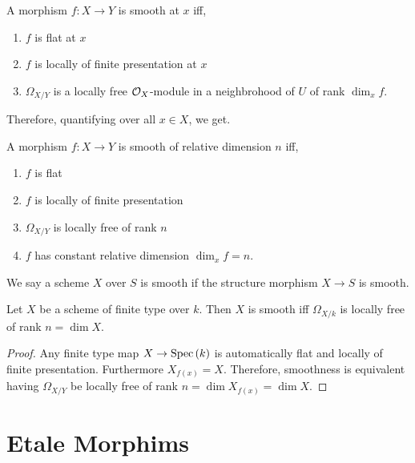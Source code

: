 \documentclass[12pt]{article}
\begin{document}
\begin{proposition}
A morphism $f :X \to Y$ is smooth at $x$ iff,
\begin{enumerate}
\item $f$ is flat at $x$
\item $f$ is locally of finite presentation at $x$
\item $\Omega_{X/Y}$ is a locally free $\mathcal{O}_{X}$-module in a neighbrohood of $U$ of rank $\dim_x {f}$. 
\end{enumerate}
\end{proposition}

\begin{remark}
Therefore, quantifying over all $x \in X$, we get.
\end{remark}

\begin{proposition}
A morphism $f : X \to Y$ is smooth of relative dimension $n$ iff,
\begin{enumerate}
\item $f$ is flat
\item $f$ is locally of finite presentation
\item $\Omega_{X / Y}$ is locally free of rank $n$
\item $f$ has constant relative dimension $\dim_x{f} = n$.
\end{enumerate}
\end{proposition}

\begin{definition}
We say a scheme $X$ over $S$ is smooth if the structure morphism $X \to S$ is smooth.
\end{definition}

\begin{definition}
Let $X$ be a scheme of finite type over $k$. Then $X$ is smooth iff $\Omega_{X / k}$ is locally free of rank $n = \dim{X}$.
\end{definition}

\begin{proof}
Any finite type map $X \to \mathrm{Spec}\left( k \right)$ is automatically flat and locally of finite presentation. Furthermore $X_{f(x)} = X$. Therefore, smoothness is equivalent having $\Omega_{X / Y}$ be locally free of rank $n = \dim{X_{f(x)}} = \dim{X}$.
\end{proof}

\section{Etale Morphims}
\end{document}
